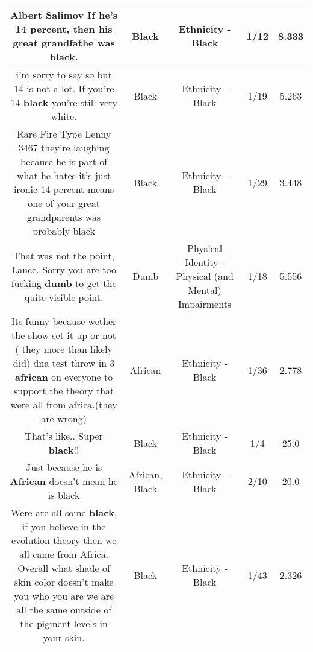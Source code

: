 \documentclass[11pt]{article}
\newlength\mylength
\begin{document}
\begin{center}
\begin{longtable}{|C{.65\mylength}|C{.30\mylength}|C{.12\mylength}|C{.12\mylength}|C{.12\mylength}|}
  \small Albert Salimov If he's 14 percent, then his great grandfathe was \textbf{black}.\normalsize   & Black & Ethnicity - Black & 1/12 & 8.333 \\  \hline
  \small i'm sorry to say so but 14 is not a lot. If you're 14 \textbf{black} you're still very white.\normalsize   & Black & Ethnicity - Black & 1/19 & 5.263 \\  \hline
  \small Rare Fire Type Lenny 3467 they're laughing because he is part of what he hates it's just ironic 14 percent means one of your great grandparents was probably black\normalsize   & Black & Ethnicity - Black & 1/29 & 3.448 \\  \hline
  \small That was not the point, Lance.  Sorry you are too fucking \textbf{dumb} to get the quite visible point.\normalsize   & Dumb & Physical Identity - Physical (and Mental) Impairments & 1/18 & 5.556 \\  \hline
  \small Its funny because wether the show set it up or not ( they more than likely did) dna test throw in 3 \textbf{african} on everyone to support the theory that were all from africa.(they are wrong)\normalsize   & African & Ethnicity - Black & 1/36 & 2.778 \\  \hline
  \small That's like.. Super \textbf{black}!!\normalsize   & Black & Ethnicity - Black & 1/4 & 25.0 \\  \hline
  \small Just because he is \textbf{African} doesn't mean he is black\normalsize   & African, Black & Ethnicity - Black & 2/10 & 20.0 \\  \hline
  \small Were are all some \textbf{black}, if you believe in the evolution theory then we all came from Africa. Overall what shade of skin color doesn't make you who you are we are all the same outside of the pigment levels in your skin.\normalsize   & Black & Ethnicity - Black & 1/43 & 2.326 \\  \hline

\end{longtable}
\end{center}
\end{document}
